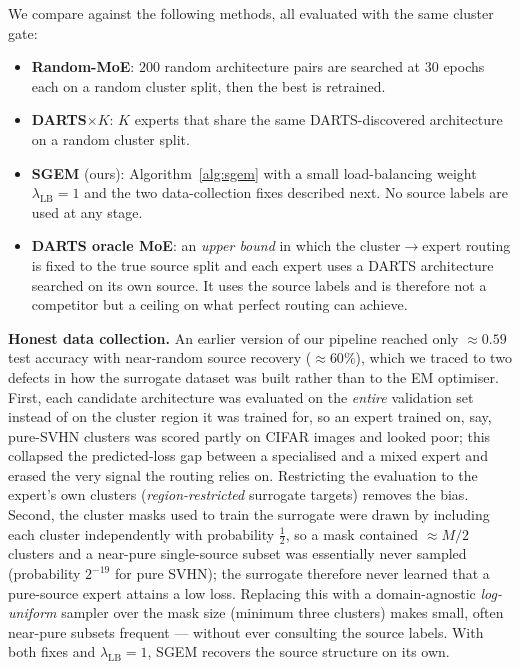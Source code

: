 We compare against the following methods, all evaluated with the same
cluster gate:
\begin{itemize}
    \item \textbf{Random-MoE}: $200$ random architecture pairs are
    searched at $30$ epochs each on a random cluster split, then the
    best is retrained.
    \item \textbf{DARTS$\times K$}: $K$ experts that share the same
    DARTS-discovered architecture on a random cluster split.
    \item \textbf{SGEM} (ours): Algorithm~\ref{alg:sgem} with a small
    load-balancing weight $\lambda_{\text{LB}} = 1$ and the two
    data-collection fixes described next. No source labels are used at
    any stage.
    \item \textbf{DARTS oracle MoE}: an \emph{upper bound} in which the
    cluster$\to$expert routing is fixed to the true source split and each
    expert uses a DARTS architecture searched on its own source. It uses
    the source labels and is therefore not a competitor but a ceiling on
    what perfect routing can achieve.
\end{itemize}

\textbf{Honest data collection.} An earlier version of our pipeline
reached only $\approx\!0.59$ test accuracy with near-random source
recovery ($\approx\!60\%$), which we traced to two defects in how the
surrogate dataset was built rather than to the EM optimiser. First, each
candidate architecture was evaluated on the \emph{entire} validation set
instead of on the cluster region it was trained for, so an expert trained
on, say, pure-SVHN clusters was scored partly on CIFAR images and looked
poor; this collapsed the predicted-loss gap between a specialised and a
mixed expert and erased the very signal the routing relies on.
Restricting the evaluation to the expert's own clusters
(\emph{region-restricted} surrogate targets) removes the bias. Second,
the cluster masks used to train the surrogate were drawn by including
each cluster independently with probability $\tfrac12$, so a mask
contained $\approx\!M/2$ clusters and a near-pure single-source subset
was essentially never sampled (probability $2^{-19}$ for pure SVHN); the
surrogate therefore never learned that a pure-source expert attains a low
loss. Replacing this with a domain-agnostic \emph{log-uniform} sampler
over the mask size (minimum three clusters) makes small, often near-pure
subsets frequent --- without ever consulting the source labels. With both
fixes and $\lambda_{\text{LB}} = 1$, SGEM recovers the source structure
on its own.


